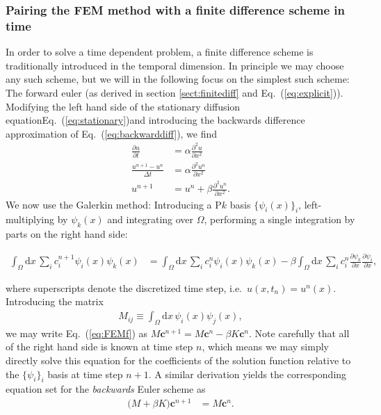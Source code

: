 \documentclass[a4paper, twocolumn]{article}
\newcommand{\eq} [1]{Eq.\ (\ref{eq:#1})}
\begin{document}
\subsubsection{Pairing the FEM method with a finite difference scheme in time}
In order to solve a time dependent problem, a finite difference scheme is traditionally introduced in the temporal dimension. In principle we may choose any such scheme, but we will in the following focus on the simplest such scheme: The forward euler (as derived in section \ref{sect:finitediff} and \eq{explicit}). Modifying the left hand side of the stationary diffusion equation\textemdash \eq{stationary}\textemdash and introducing the backwards difference approximation of \eq{backwarddiff}, we find
\begin{align}
\frac{\partial u}{\partial t} &= \alpha\frac{\partial^2 u}{\partial x^2} \nonumber \\
%
\frac{u^{n+1}-u^{n}}{\Delta t} &=  \alpha\frac{\partial^2 u^n}{\partial x^2} \nonumber \\
%
u^{n+1} &= u^{n} + \beta \frac{\partial^2 u^n}{\partial x^2}.
\end{align}
We now use the Galerkin method: Introducing a P$k$ basis $\{\psi_i(x)\}_i$, left-multiplying by $\psi_k(x)$ and integrating over $\Omega$, performing a single integration by parts on the right hand side:
\begin{strip}
\begin{align}
\int_\Omega\mathrm{d}x\, \sum_ic^{n+1}_i\psi_i(x) \psi_k(x) &= \int_\Omega\mathrm{d}x\, \sum_ic^{n}_i\psi_i(x) \psi_k(x) - \beta\int_\Omega\mathrm{d}x\, \sum_i c_i^n\frac{\partial \psi_k}{\partial x}\frac{\partial \psi_i}{\partial x}, \label{eq:FEMf}
\end{align}
\end{strip}
where superscripts denote the discretized time step, i.e.\ $u(x,t_n)=u^n(x)$. Introducing the matrix 
\begin{align}
M_{ij}\equiv \int_\Omega \mathrm{d}x\, \psi_i(x)\psi_j(x),
\end{align}
we may write \eq{FEMf} as $M\mathbf{c}^{n+1}=M\mathbf{c}^n -\beta K\mathbf{c}^n$. Note carefully that all of the right hand side is known at time step $n$, which means we may simply directly solve this equation for the coefficients of the solution function relative to the $\{\psi_i\}_i$ basis at time step $n+1$. A similar derivation yields the corresponding equation set for the \textit{backwards} Euler scheme as
\begin{align}
\Big(M +\beta K\Big)\mathbf{c}^{n+1} &= M \mathbf{c}^n. 
\end{align}
\end{document}
